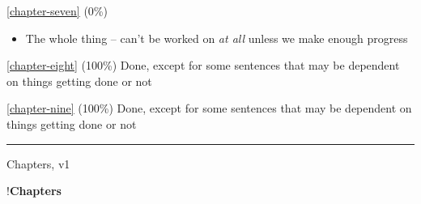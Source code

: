 \autoref{chapter-seven} (0\%)

\begin{itemize}
\tightlist
\item
  The whole thing -- can't be worked on \emph{at all} unless we make
  enough progress
\end{itemize}

\autoref{chapter-eight} (100\%) Done, except for some sentences that
may be dependent on things getting done or not

\autoref{chapter-nine} (100\%) Done, except for some sentences that
may be dependent on things getting done or not

\begin{center}\rule{0.5\linewidth}{0.5pt}\end{center}

Chapters, v1

!\textbf{Chapters}
